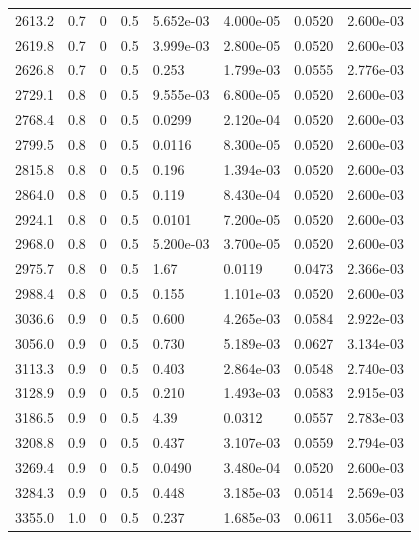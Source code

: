 \documentclass[preview]{standalone}
\begin{document}
{{{\begin{tabular}{L{1.2cm}C{1.2cm} C{0.3cm}C{0.5cm} C{1.4cm}C{1.4cm} C{1.4cm}C{1.4cm}}
  2613.2  &   0.7  & 0     & 0.5 &  5.652e-03  & 4.000e-05  & 0.0520 &  2.600e-03   \\ 
  2619.8  &   0.7  & 0     & 0.5 &  3.999e-03  & 2.800e-05  & 0.0520 &  2.600e-03   \\ 
  2626.8  &   0.7  & 0     & 0.5 &  0.253  & 1.799e-03  & 0.0555 &  2.776e-03   \\ 
  2729.1  &   0.8  & 0     & 0.5 &  9.555e-03  & 6.800e-05  & 0.0520 &  2.600e-03   \\ 
  2768.4  &   0.8  & 0     & 0.5 &  0.0299  & 2.120e-04  & 0.0520 &  2.600e-03   \\ 
  2799.5  &   0.8  & 0     & 0.5 &  0.0116  & 8.300e-05  & 0.0520 &  2.600e-03   \\ 
  2815.8  &   0.8  & 0     & 0.5 &  0.196  & 1.394e-03  & 0.0520 &  2.600e-03   \\ 
  2864.0  &   0.8  & 0     & 0.5 &  0.119  & 8.430e-04  & 0.0520 &  2.600e-03   \\ 
  2924.1  &   0.8  & 0     & 0.5 &  0.0101  & 7.200e-05  & 0.0520 &  2.600e-03   \\ 
  2968.0  &   0.8  & 0     & 0.5 &  5.200e-03  & 3.700e-05  & 0.0520 &  2.600e-03   \\ 
  2975.7  &   0.8  & 0     & 0.5 &  1.67  & 0.0119  & 0.0473 &  2.366e-03   \\ 
  2988.4  &   0.8  & 0     & 0.5 &  0.155  & 1.101e-03  & 0.0520 &  2.600e-03   \\ 
  3036.6  &   0.9  & 0     & 0.5 &  0.600  & 4.265e-03  & 0.0584 &  2.922e-03   \\ 
  3056.0  &   0.9  & 0     & 0.5 &  0.730  & 5.189e-03  & 0.0627 &  3.134e-03   \\ 
  3113.3  &   0.9  & 0     & 0.5 &  0.403  & 2.864e-03  & 0.0548 &  2.740e-03   \\ 
  3128.9  &   0.9  & 0     & 0.5 &  0.210  & 1.493e-03  & 0.0583 &  2.915e-03   \\ 
  3186.5  &   0.9  & 0     & 0.5 &  4.39  & 0.0312  & 0.0557 &  2.783e-03   \\ 
  3208.8  &   0.9  & 0     & 0.5 &  0.437  & 3.107e-03  & 0.0559 &  2.794e-03   \\ 
  3269.4  &   0.9  & 0     & 0.5 &  0.0490  & 3.480e-04  & 0.0520 &  2.600e-03   \\ 
  3284.3  &   0.9  & 0     & 0.5 &  0.448  & 3.185e-03  & 0.0514 &  2.569e-03   \\ 
  3355.0  &   1.0  & 0     & 0.5 &  0.237  & 1.685e-03  & 0.0611 &  3.056e-03   \\ 

\end{tabular}}}}
\end{document}
